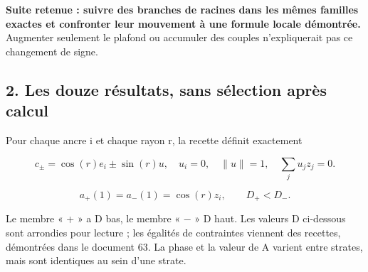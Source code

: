 \documentclass[
  10pt,
  a4paper,
]{article}
\begin{document}
\textbf{Suite retenue : suivre des branches de racines dans les mêmes
familles exactes et confronter leur mouvement à une formule locale
démontrée.} Augmenter seulement le plafond ou accumuler des couples
n'expliquerait pas ce changement de signe.

\newpage

\hypertarget{les-douze-ruxe9sultats-sans-suxe9lection-apruxe8s-calcul}{%
\subsection{2. Les douze résultats, sans sélection après
calcul}\label{les-douze-ruxe9sultats-sans-suxe9lection-apruxe8s-calcul}}

Pour chaque ancre i et chaque rayon r, la recette définit exactement

\[c_\pm=\cos(r)e_i\pm\sin(r)u,\quad u_i=0,\quad\|u\|=1,\quad\sum_j u_jz_j=0.\]

\[a_+(1)=a_-(1)=\cos(r)z_i,\qquad D_+<D_-.\]

Le membre « + » a D bas, le membre « − » D haut. Les valeurs D
ci-dessous sont arrondies pour lecture ; les égalités de contraintes
viennent des recettes, démontrées dans le document 63. La phase et la
valeur de A varient entre strates, mais sont identiques au sein d'une
strate.
\end{document}
